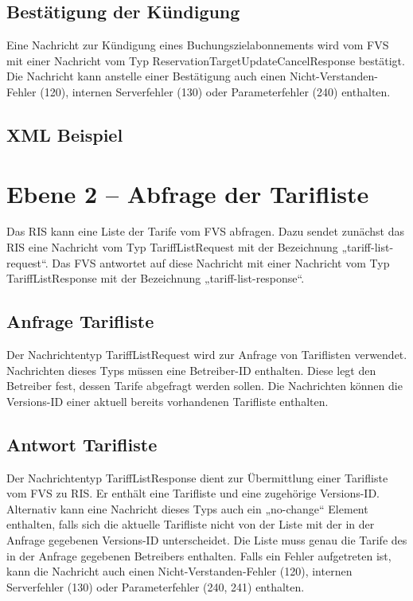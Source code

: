 

\subsection{Bestätigung der Kündigung}
Eine Nachricht zur Kündigung eines Buchungszielabonnements wird vom FVS mit einer Nachricht vom Typ ReservationTargetUpdateCancelResponse bestätigt. Die Nachricht kann anstelle einer Bestätigung auch einen Nicht-Verstanden-Fehler (120), internen Serverfehler (130) oder Parameterfehler (240) enthalten.



\subsection{XML Beispiel}

\section{Ebene 2 -- Abfrage der Tarifliste}
Das RIS kann eine Liste der Tarife vom FVS abfragen. Dazu sendet zunächst das RIS eine Nachricht vom Typ TariffListRequest mit der Bezeichnung „tariff-list-request“. Das FVS antwortet auf diese Nachricht mit einer Nachricht vom Typ TariffListResponse mit der Bezeichnung „tariff-list-response“.



\subsection{Anfrage Tarifliste}
Der Nachrichtentyp TariffListRequest wird zur Anfrage von Tariflisten verwendet. Nachrichten dieses Typs müssen eine Betreiber-ID enthalten. Diese legt den Betreiber fest, dessen Tarife abgefragt werden sollen. Die Nachrichten können die Versions-ID einer aktuell bereits vorhandenen Tarifliste enthalten.



\subsection{Antwort Tarifliste}
Der Nachrichtentyp TariffListResponse dient zur Übermittlung einer Tarifliste vom FVS zu RIS. Er enthält eine Tarifliste und eine zugehörige Versions-ID. Alternativ kann eine Nachricht dieses Typs auch ein „no-change“ Element enthalten, falls sich die aktuelle Tarifliste nicht von der Liste mit der in der Anfrage gegebenen Versions-ID  unterscheidet. Die Liste muss genau die Tarife des in der Anfrage gegebenen Betreibers enthalten. Falls ein Fehler aufgetreten ist, kann die Nachricht auch einen Nicht-Verstanden-Fehler (120), internen Serverfehler (130) oder Parameterfehler (240, 241) enthalten.

